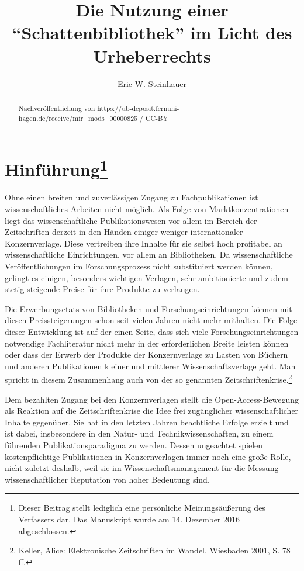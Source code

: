 \documentclass[a4paper,
fontsize=11pt,
oneside,
numbers=noperiodatend,
parskip=half-,
bibliography=totoc,
final
]{scrartcl}
\title{\LARGE{Die Nutzung einer \enquote{Schattenbibliothek} im Licht des Urheberrechts}} %
\author{Eric W. Steinhauer} %
\date{}
\begin{document}
\maketitle
\thispagestyle{fancyplain} 

\begin{abstract}
Nachveröffentlichung von
\url{https://ub-deposit.fernuni-hagen.de/receive/mir_mods_00000825} /
CC-BY
\end{abstract}

\section{Hinführung\protect\footnote{Dieser
  Beitrag stellt lediglich eine persönliche Meinungsäußerung des
  Verfassers dar. Das Manuskript wurde am 14. Dezember 2016
  abgeschlossen.}}

Ohne einen breiten und zuverlässigen Zugang zu Fachpublikationen ist
wissenschaftliches Arbeiten nicht möglich. Als Folge von
Marktkonzentrationen liegt das wissenschaftliche Publikationswesen vor
allem im Bereich der Zeitschriften derzeit in den Händen einiger weniger
internationaler Konzernverlage. Diese vertreiben ihre Inhalte für sie
selbst hoch profitabel an wissenschaftliche Einrichtungen, vor allem an
Bibliotheken. Da wissenschaftliche Veröffentlichungen im
Forschungsprozess nicht substituiert werden können, gelingt es einigen,
besonders wichtigen Verlagen, sehr ambitionierte und zudem stetig
steigende Preise für ihre Produkte zu verlangen.

Die Erwerbungsetats von Bibliotheken und Forschungseinrichtungen können
mit diesen Preissteigerungen schon seit vielen Jahren nicht mehr
mithalten. Die Folge dieser Entwicklung ist auf der einen Seite, dass
sich viele Forschungseinrichtungen notwendige Fachliteratur nicht mehr
in der erforderlichen Breite leisten können oder dass der Erwerb der
Produkte der Konzernverlage zu Lasten von Büchern und anderen
Publikationen kleiner und mittlerer Wissenschaftsverlage geht. Man
spricht in diesem Zusammenhang auch von der so genannten
Zeitschriftenkrise.\footnote{Keller, Alice: Elektronische Zeitschriften
  im Wandel, Wiesbaden 2001, S. 78 ff.}

Dem bezahlten Zugang bei den Konzernverlagen stellt die
Open-Access-Bewegung als Reaktion auf die Zeitschriftenkrise die Idee
frei zugänglicher wissenschaftlicher Inhalte gegenüber. Sie hat in den
letzten Jahren beachtliche Erfolge erzielt und ist dabei, insbesondere
in den Natur- und Technikwissenschaften, zu einem führenden
Publikationsparadigma zu werden. Dessen ungeachtet spielen
kostenpflichtige Publikationen in Konzernverlagen immer noch eine große
Rolle, nicht zuletzt deshalb, weil sie im Wissenschaftsmanagement für
die Messung wissenschaftlicher Reputation von hoher Bedeutung sind.
\end{document}
